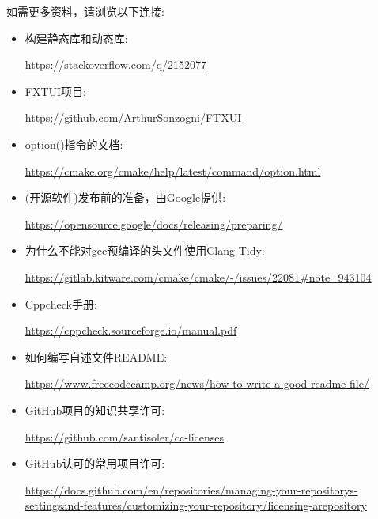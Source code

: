 如需更多资料，请浏览以下连接:

\begin{itemize}
\item 
构建静态库和动态库:

\url{https://stackoverflow.com/q/2152077}

\item 
FXTUI项目:

\url{https://github.com/ArthurSonzogni/FTXUI}

\item 
option()指令的文档: 

\url{https://cmake.org/cmake/help/latest/command/option.html}

\item 
(开源软件)发布前的准备，由Google提供:

\url{https://opensource.google/docs/releasing/preparing/}

\item 
为什么不能对gcc预编译的头文件使用Clang-Tidy:

\url{https://gitlab.kitware.com/cmake/cmake/-/issues/22081\#note\_943104}

\item 
Cppcheck手册:

\url{https://cppcheck.sourceforge.io/manual.pdf}

\item 
如何编写自述文件README:

\url{https://www.freecodecamp.org/news/how-to-write-a-good-readme-file/}

\item 
GitHub项目的知识共享许可:

\url{https://github.com/santisoler/cc-licenses}

\item 
GitHub认可的常用项目许可:

\url{https://docs.github.com/en/repositories/managing-your-repositorys-settingsand-features/customizing-your-repository/licensing-arepository}
\end{itemize}
